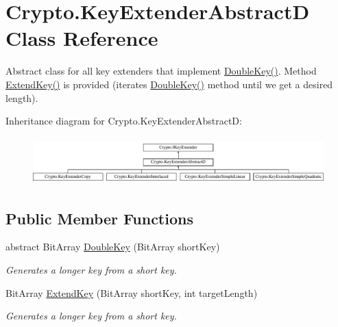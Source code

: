 \hypertarget{class_crypto_1_1_key_extender_abstract_d}{}\section{Crypto.\+Key\+Extender\+Abstract\+D Class Reference}
\label{class_crypto_1_1_key_extender_abstract_d}


Abstract class for all key extenders that implement \hyperlink{class_crypto_1_1_key_extender_abstract_d_ae403b92e9038b9c0bc7a21885e24ffc7}{Double\+Key()}. Method \hyperlink{class_crypto_1_1_key_extender_abstract_d_a3ec7fa96f391d840043eff0c8409d130}{Extend\+Key()} is provided (iterates \hyperlink{class_crypto_1_1_key_extender_abstract_d_ae403b92e9038b9c0bc7a21885e24ffc7}{Double\+Key()} method until we get a desired length).  


Inheritance diagram for Crypto.\+Key\+Extender\+Abstract\+D\+:\begin{figure}[H]
\begin{center}
\leavevmode
\includegraphics[height=1.850220cm]{class_crypto_1_1_key_extender_abstract_d}
\end{center}
\end{figure}
\subsection*{Public Member Functions}
\begin{DoxyCompactItemize}
\item 
abstract Bit\+Array \hyperlink{class_crypto_1_1_key_extender_abstract_d_ae403b92e9038b9c0bc7a21885e24ffc7}{Double\+Key} (Bit\+Array short\+Key)
\begin{DoxyCompactList}\small\item\em Generates a longer key from a short key. \end{DoxyCompactList}\item 
Bit\+Array \hyperlink{class_crypto_1_1_key_extender_abstract_d_a3ec7fa96f391d840043eff0c8409d130}{Extend\+Key} (Bit\+Array short\+Key, int target\+Length)
\begin{DoxyCompactList}\small\item\em Generates a longer key from a short key. \end{DoxyCompactList}\end{DoxyCompactItemize}


